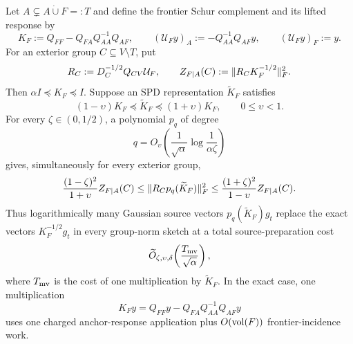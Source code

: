 \begin{proposition}
\label{prop:spectral-frontier-chebyshev-whitening}
Let $A\subsetneq A\mathbin{\dot\cup}F=:T$ and define the frontier Schur
complement and its lifted response by
\begin{equation*}
 K_F:=Q_{FF}-Q_{FA}Q_{AA}^{-1}Q_{AF},
 \qquad
 (\mathcal U_Fy)_A:=-Q_{AA}^{-1}Q_{AF}y,
 \qquad
 (\mathcal U_Fy)_F:=y.
\end{equation*}
For an exterior group $C\subseteq V\setminus T$, put
\begin{equation}
 R_C:=D_C^{-1/2}Q_{CV}\mathcal U_F,
 \qquad
 Z_{F\mid A}(C):=\lVert R_CK_F^{-1/2}\rVert_F^2.
 \label{eq:frontier-whitening-group-mass}
\end{equation}
Then $\alpha I\preceq K_F\preceq I$.  Suppose an SPD representation
$\widetilde K_F$ satisfies
\begin{equation}
 (1-\upsilon)K_F\preceq\widetilde K_F
 \preceq(1+\upsilon)K_F,
 \qquad 0\leq\upsilon<1.
 \label{eq:frontier-whitening-spectral-approximation}
\end{equation}
For every $\zeta\in(0,1/2)$, a polynomial $p_q$ of degree
\begin{equation}
 q=O_\upsilon\!\left(
  \frac1{\sqrt\alpha}\log\frac1{\alpha\zeta}
 \right)
 \label{eq:frontier-whitening-polynomial-degree}
\end{equation}
gives, simultaneously for every exterior group,
\begin{equation}
 \frac{(1-\zeta)^2}{1+\upsilon}Z_{F\mid A}(C)
 \leq\lVert R_Cp_q(\widetilde K_F)\rVert_F^2
 \leq
 \frac{(1+\zeta)^2}{1-\upsilon}Z_{F\mid A}(C).
 \label{eq:frontier-whitening-group-sandwich}
\end{equation}
Thus logarithmically many Gaussian source vectors
$p_q(\widetilde K_F)g_t$ replace the exact vectors $K_F^{-1/2}g_t$ in every
group-norm sketch at a total source-preparation cost
\begin{equation}
 \widetilde O_{\zeta,\upsilon,\delta}\!\left(
  \frac{T_{\rm mv}}{\sqrt\alpha}
 \right),
 \label{eq:frontier-whitening-source-work}
\end{equation}
where $T_{\rm mv}$ is the cost of one multiplication by
$\widetilde K_F$.  In the exact case, one multiplication
\begin{equation}
 K_Fy=Q_{FF}y-Q_{FA}Q_{AA}^{-1}Q_{AF}y
 \label{eq:frontier-whitening-exact-matvec}
\end{equation}
uses one charged anchor-response application plus
$O(\operatorname{vol}(F))$ frontier-incidence work.
\end{proposition}

